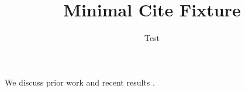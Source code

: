 \documentclass{article}
\title{Minimal Cite Fixture}
\author{Test}
\begin{document}
\maketitle
We discuss prior work \cite{ref1,ref2} and recent results \cite{ref3}.
\end{document}
